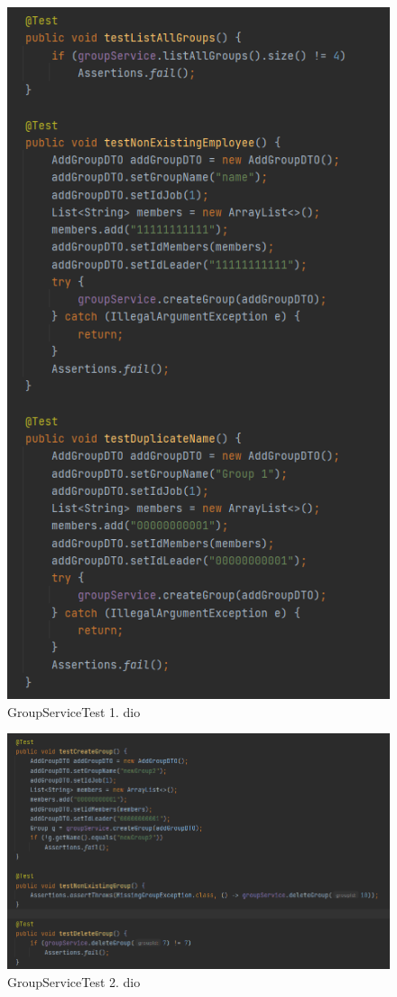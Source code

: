 			\begin{figure}[H] 					\centering 				\includegraphics[height=0.7\textheight]{Dokumentacija/ispit-komp/GroupServiceTest 1.png}
				\caption{GroupServiceTest 1. dio}
				\end{figure}
                \begin{figure}[H] 					\centering 					                    \includegraphics[width=\textwidth,height=\textheight,keepaspectratio]{Dokumentacija/ispit-komp/GroupServiceTest2.png}
				\caption{GroupServiceTest 2. dio}
				\end{figure}
